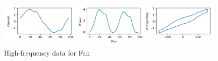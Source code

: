 \begin{figure} 
	\centering
	\includegraphics[width=1\linewidth]{images/fan10A2311}
	\caption[High-frequency data for Fan]{High-frequency data for Fan}
	\label{fig:fan10A2311}
\end{figure}
